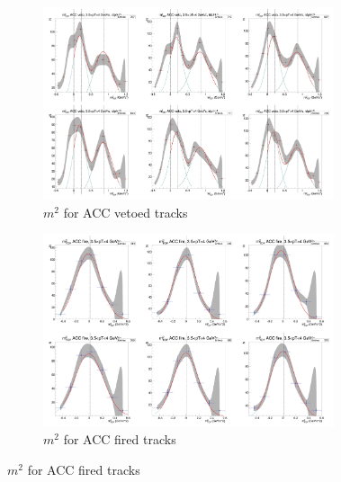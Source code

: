 \begin{figure}[H]
  \ContinuedFloat
    \begin{subfigure}{1\textwidth}
   \centering
   \includegraphics[width=0.94\textwidth]{hiptfits/pos/PSm2_cent0_ich1_accfire0_ptbin13.jpg}
    \caption{$m^2$ for ACC vetoed tracks}
    \end{subfigure}
    \begin{subfigure}{1\textwidth}
   \centering
   \includegraphics[width=0.94\textwidth]{hiptfits/pos/PSm2_cent0_ich1_accfire1_ptbin13.jpg}
    \caption{$m^2$ for ACC fired tracks}
    \end{subfigure}  
\end{figure}
